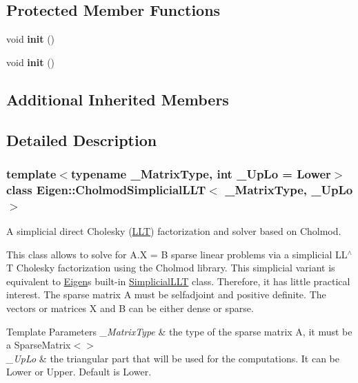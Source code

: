 \subsection*{Protected Member Functions}
\begin{DoxyCompactItemize}
\item 
\mbox{\label{class_eigen_1_1_cholmod_simplicial_l_l_t_a6014655338ba52e480682c73b9da2061}} 
void {\bfseries init} ()
\item 
\mbox{\label{class_eigen_1_1_cholmod_simplicial_l_l_t_a6014655338ba52e480682c73b9da2061}} 
void {\bfseries init} ()
\end{DoxyCompactItemize}
\subsection*{Additional Inherited Members}


\subsection{Detailed Description}
\subsubsection*{template$<$typename \+\_\+\+Matrix\+Type, int \+\_\+\+Up\+Lo = Lower$>$\newline
class Eigen\+::\+Cholmod\+Simplicial\+L\+L\+T$<$ \+\_\+\+Matrix\+Type, \+\_\+\+Up\+Lo $>$}

A simplicial direct Cholesky (\hyperlink{group___cholesky___module_class_eigen_1_1_l_l_t}{L\+LT}) factorization and solver based on Cholmod. 

This class allows to solve for A.\+X = B sparse linear problems via a simplicial L\+L$^\wedge$T Cholesky factorization using the Cholmod library. This simplicial variant is equivalent to \hyperlink{namespace_eigen}{Eigen}\textquotesingle{}s built-\/in \hyperlink{group___sparse_cholesky___module_class_eigen_1_1_simplicial_l_l_t}{Simplicial\+L\+LT} class. Therefore, it has little practical interest. The sparse matrix A must be selfadjoint and positive definite. The vectors or matrices X and B can be either dense or sparse.


\begin{DoxyTemplParams}{Template Parameters}
{\em \+\_\+\+Matrix\+Type} & the type of the sparse matrix A, it must be a Sparse\+Matrix$<$$>$ \\
\hline
{\em \+\_\+\+Up\+Lo} & the triangular part that will be used for the computations. It can be Lower or Upper. Default is Lower.\\
\hline
\end{DoxyTemplParams}


